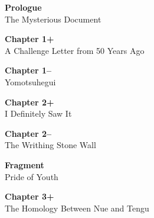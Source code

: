 \documentclass[
    a4paper,
    12pt,
    twoside,
    openany,
    UTF8,
    fontset=windows
]{ctexbook}
\begin{document}
\hspace*{\fill}
\begin{minipage}{0.88\textwidth}
    \begin{flushright}
        \vspace*{-1.0cm}
    \end{flushright}
    
    \vspace{0.3cm}
    
    \begin{flushleft}
    \footnotesize                     %
    \begin{list}{}{
        \setlength{\leftmargin}{0pt}
        \setlength{\labelwidth}{0pt}
        \setlength{\itemindent}{0pt}
        \setlength{\parsep}{0.1ex}    %
        \setlength{\topsep}{0pt}
        \setlength{\partopsep}{0pt}
        \setlength{\itemsep}{0pt}
    }
        \item \textbf{Prologue} \dotfill \pageref{sec:prologueV2} \\[-0.1ex]
        The Mysterious Document
        
        \item \textbf{Chapter 1+} \dotfill \pageref{sec:ch1p} \\[-0.1ex]
        A Challenge Letter from 50 Years Ago
        
        \item \textbf{Chapter 1--} \dotfill \pageref{sec:ch1m} \\[-0.1ex]
        Yomotsuhegui
        
        \item \textbf{Chapter 2+} \dotfill \pageref{sec:ch2p} \\[-0.1ex]
        I Definitely Saw It
        
        \item \textbf{Chapter 2--} \dotfill \pageref{sec:ch2m} \\[-0.1ex]
        The Writhing Stone Wall
        
        \item \textbf{Fragment} \dotfill \pageref{sec:fragPride} \\[-0.1ex]
        Pride of Youth
        
        \item \textbf{Chapter 3+} \dotfill \pageref{sec:ch3p} \\[-0.1ex]
        The Homology Between Nue and Tengu
        

\end{list}
\end{flushleft}
\end{minipage}
\end{document}
